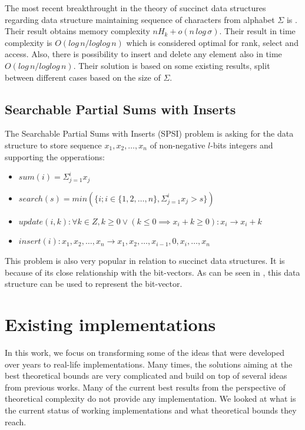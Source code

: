 The most recent breakthrought in the theory of succinct data structures regarding data structure maintaining sequence of characters from alphabet $\Sigma$ is \cite{munro2015compressed}. Their result obtains memory complexity $nH_k+o(n\,log\,\sigma)$. Their result in time complexity is $O(log\,n/log log\,n)$ which is considered optimal for rank, select and access. Also, there is possibility to insert and delete any element also in time $O(log\,n/log log\,n)$. Their solution is based on some existing results, split between different cases based on the size of $\Sigma$.

\subsection{Searchable Partial Sums with Inserts}

\begin{theorem}
The Searchable Partial Sums with Inserts (SPSI) problem is asking for the data structure to
store sequence $x_1, x_2, \ldots , x_n$ of non-negative $l$-bits integers and supporting the opperations:
\begin{itemize}
    \item $sum(i) = \Sigma_{j=1}^{i} x_j$
    \item $search(s) = min(\{i; i\in \{1, 2,\ldots, n\}, \Sigma_{j=1}^{i} x_j > s \})$
    \item $update(i, k): \forall k \in Z, k \geq 0 \lor (k\leq 0 \implies x_i + k \geq 0): x_i \rightarrow x_i + k$
    \item $insert(i): x_1, x_2,\ldots, x_n \rightarrow x_1, x_2,\ldots , x_{i-1}, 0, x_{i}, \ldots , x_n$
\end{itemize}
\end{theorem}

This problem is also very popular in relation to succinct data structures. It is because of its close relationship with the bit-vectors.
As can be seen in \cite{prezza2017framework}, this data structure can be used to represent the bit-vector.

\section{Existing implementations}

In this work, we focus on transforming some of the ideas that were developed over years to real-life implementations. Many times, the solutions aiming at the best theoretical bounds are very complicated and build on top of several ideas from previous works. Many of the current best results from the perspective of theoretical complexity do not provide any implementation. We looked at what is the current status of working implementations and what theoretical bounds they reach.

